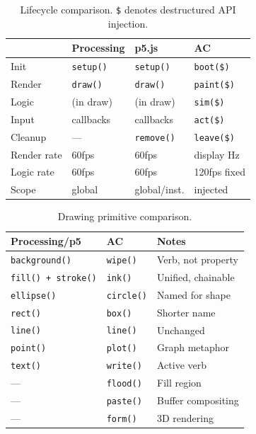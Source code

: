 \documentclass[10pt,letterpaper,twocolumn]{article}
\begin{document}
\begin{table}[h]
\small
\centering
\begin{tabularx}{\columnwidth}{lXXX}
\toprule
 & \textbf{Processing} & \textbf{p5.js} & \textbf{AC} \\
\midrule
Init & \texttt{setup()} & \texttt{setup()} & \texttt{boot(\$)} \\
Render & \texttt{draw()} & \texttt{draw()} & \texttt{paint(\$)} \\
Logic & (in draw) & (in draw) & \texttt{sim(\$)} \\
Input & callbacks & callbacks & \texttt{act(\$)} \\
Cleanup & --- & \texttt{remove()} & \texttt{leave(\$)} \\
\midrule
Render rate & 60fps & 60fps & display Hz \\
Logic rate & 60fps & 60fps & 120fps fixed \\
Scope & global & global/inst. & injected \\
\bottomrule
\end{tabularx}
\caption{Lifecycle comparison. \texttt{\$} denotes destructured API injection.}
\label{tab:lifecycle}
\end{table}

\begin{table}[h]
\small
\centering
\begin{tabularx}{\columnwidth}{lXX}
\toprule
\textbf{Processing/p5} & \textbf{AC} & \textbf{Notes} \\
\midrule
\texttt{background()} & \texttt{wipe()} & Verb, not property \\
\texttt{fill() + stroke()} & \texttt{ink()} & Unified, chainable \\
\texttt{ellipse()} & \texttt{circle()} & Named for shape \\
\texttt{rect()} & \texttt{box()} & Shorter name \\
\texttt{line()} & \texttt{line()} & Unchanged \\
\texttt{point()} & \texttt{plot()} & Graph metaphor \\
\texttt{text()} & \texttt{write()} & Active verb \\
--- & \texttt{flood()} & Fill region \\
--- & \texttt{paste()} & Buffer compositing \\
--- & \texttt{form()} & 3D rendering \\
\bottomrule
\end{tabularx}
\caption{Drawing primitive comparison.}
\label{tab:drawing}
\end{table}
\end{document}
